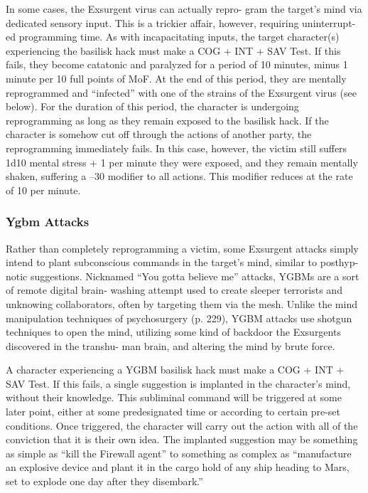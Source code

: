 In some cases, the Exsurgent virus can actually repro-
gram the target's mind via dedicated sensory input. 
This is a trickier affair, however, requiring uninterrupt-
ed programming time. As with incapacitating inputs, 
the target character(s) experiencing the basilisk hack 
must make a COG + INT + SAV Test. If this fails, they 
become catatonic and paralyzed for a period of 10 
minutes, minus 1 minute per 10 full points of MoF. At 
the end of this period, they are mentally reprogrammed 
and ``infected'' with one of the strains of the Exsurgent 
virus (see below). For the duration of this period, the 
character is undergoing reprogramming as long as they 
remain exposed to the basilisk hack. If the character is 
somehow cut off through the actions of another party, 
the reprogramming immediately fails. In this case, 
however, the victim still suffers 1d10 mental stress 
+ 1 per minute they were exposed, and they remain 
mentally shaken, suffering a –30 modifier to all actions. 
This modifier reduces at the rate of 10 per minute.

\subsubsection{Ygbm Attacks }

Rather than completely reprogramming a victim, some 
Exsurgent attacks simply intend to plant subconscious 
commands in the target's mind, similar to posthyp-
notic suggestions. Nicknamed ``You gotta believe me'' 
attacks, YGBMs are a sort of remote digital brain-
washing attempt used to create sleeper terrorists and 
unknowing collaborators, often by targeting them via 
the mesh. Unlike the mind manipulation techniques 
of psychosurgery (p. 229), YGBM attacks use shotgun 
techniques to open the mind, utilizing some kind of 
backdoor the Exsurgents discovered in the transhu-
man brain, and altering the mind by brute force.

A character experiencing a YGBM basilisk hack 
must make a COG + INT + SAV Test. If this fails, a 
single suggestion is implanted in the character's mind, 
without their knowledge. This subliminal command 
will be triggered at some later point, either at some 
predesignated time or according to certain pre-set 
conditions. Once triggered, the character will carry 
out the action with all of the conviction that it is their 
own idea. The implanted suggestion may be something 
as simple as ``kill the Firewall agent'' to something as 
complex as ``manufacture an explosive device and 
plant it in the cargo hold of any ship heading to Mars, 
set to explode one day after they disembark.''

